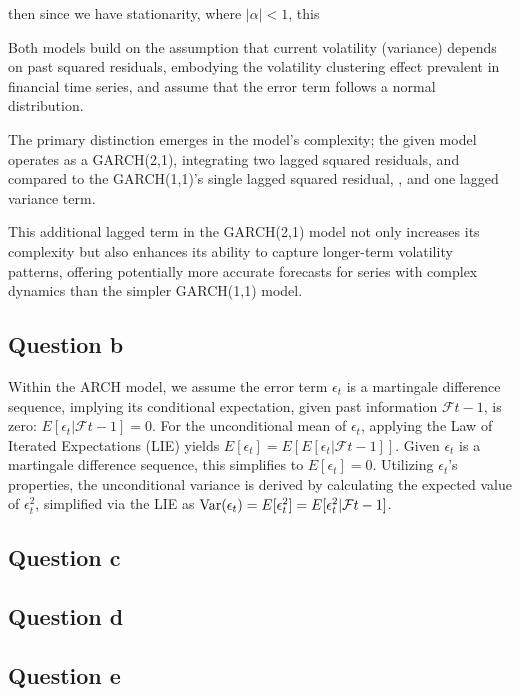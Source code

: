 \documentclass{article}
\begin{document}
 then since we have stationarity, where $|\alpha| < 1$, this


Both models build on the assumption that current volatility (variance) depends on past squared residuals, embodying the volatility clustering effect prevalent in financial time series, and assume that the error term follows a normal distribution.

The primary distinction emerges in the model's complexity; the given model operates as a GARCH(2,1), integrating two lagged squared residuals,  and  compared to the GARCH(1,1)'s single lagged squared residual, , and one lagged variance term.

This additional lagged term in the GARCH(2,1) model not only increases its complexity but also enhances its ability to capture longer-term volatility patterns, offering potentially more accurate forecasts for series with complex dynamics than the simpler GARCH(1,1) model.


\subsection*{Question b}

Within the ARCH model, we assume the error term $\epsilon_t$ is a martingale difference sequence, implying its conditional expectation, given past information $\ensuremath{\mathcal{F}}{t-1}$, is zero: $E[\epsilon_t | \ensuremath{\mathcal{F}}{t-1}] = 0$. For the unconditional mean of $\epsilon_t$, applying the Law of Iterated Expectations (LIE) yields $E[\epsilon_t] = E[E[\epsilon_t | \ensuremath{\mathcal{F}}{t-1}]]$. Given $\epsilon_t$ is a martingale difference sequence, this simplifies to $E[\epsilon_t] = 0$. Utilizing $\epsilon_t$'s properties, the unconditional variance is derived by calculating the expected value of $\epsilon_t^2$, simplified via the LIE as $\textnormal{Var}(\epsilon_t) = E[\epsilon_t^2] = E[\epsilon_t^2 | \ensuremath{\mathcal{F}}{t-1}]$.


\subsection*{Question c}

\subsection*{Question d}

\subsection*{Question e}
\end{document}
